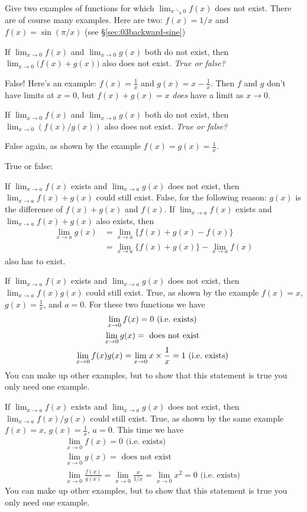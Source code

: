\problem Give two examples of functions for which $\lim_{x\searrow 0}
f(x)$ does not exist.
\answer
There are of course many examples.  Here are two: $f(x) = 1/x$ and
$f(x) = \sin(\pi/x)$ (see \S\ref{sec:03backward-sine})
\endanswer

\problem \groupproblem If $\lim_{x\to 0}f(x)$ and $\lim_{x\to0}g(x)$ both do not
exist, then $\lim_{x\to 0}\bigl(f(x) + g(x)\bigr)$ also does not exist.
\textit{True or false?}

\answer
False!  Here's an example: $f(x) = \frac1x$ and $g(x) = x-\frac1x$.
Then $f$ and $g$ don't have limits at $x=0$, but $f(x) + g(x) = x$
\textit{does} have a limit as $x\to0$.
\endanswer

\problem \groupproblem If $\lim_{x\to 0}f(x)$ and $\lim_{x\to0}g(x)$ both do not
exist, then $\lim_{x\to 0}(f(x)/g(x))$ also does not exist.  \textit{True or false?}

\answer
False again, as shown by the example $f(x) = g(x) = \frac1x$.
\endanswer

\problem True or false:

\subprob If $\lim_{x\to a} f(x)$ exists and $\lim_{x\to a} g(x)$ does
not exist, then $\lim_{x\to a} f(x) + g(x)$ could still exist.
\answer
False, for the following reason:  $g(x)$ is the difference of $f(x)+g(x)$ and
$f(x)$.  If $\lim_{x\to a} f(x)$ exists and $\lim_{x\to a} f(x) + g(x)$ also exists, then
\begin{align*}
  \lim_{x\to a} g(x) &= \lim_{x\to a} \bigl\{f(x) + g(x) - f(x)\bigr\}\\
  &= \lim_{x\to a} \bigl\{f(x) + g(x)\bigr\} - \lim_{x\to a} f(x)
\end{align*}
also has to exist.
\endanswer

\subprob If $\lim_{x\to a} f(x)$ exists and $\lim_{x\to a} g(x)$ does
not exist, then $\lim_{x\to a} f(x) g(x)$ could still exist.
\answer
True, as shown by the example $f(x) = x$, $g(x) = \frac{1}{x}$, and $a=0$.
For these two functions we have
\begin{gather*}
  \lim_{x\to 0} f(x) = 0 \text{ (i.e.\ exists) } \\
  \lim_{x\to 0} g(x) = \text{ does not exist } \\
  \lim_{x\to 0} f(x) g(x) = \lim_{x\to 0} x\times\frac1x = 1 \text{ (i.e.\
  exists) } 
\end{gather*}
You can make up other examples, but to show that this statement is true you only
need one example.
\endanswer

\subprob If $\lim_{x\to a} f(x)$ exists and $\lim_{x\to a} g(x)$ does
not exist, then $\lim_{x\to a} f(x)/g(x)$ could still exist.
\answer
True, as shown by the same example $f(x) = x$, $g(x) = \frac{1}{x}$, $a=0$.
This time we have
\begin{gather*}
  \lim_{x\to 0} f(x) = 0 \text{ (i.e.\ exists) } \\
  \lim_{x\to 0} g(x) = \text{ does not exist } \\
  \lim_{x\to 0} \frac{f(x)}{g(x)} = \lim_{x\to 0} \frac{x}{1/x} =\lim_{x\to0}
  x^2 = 0 \text{ (i.e.\ exists) } 
\end{gather*}
You can make up other examples, but to show that this statement is true you only
need one example.
\endanswer

